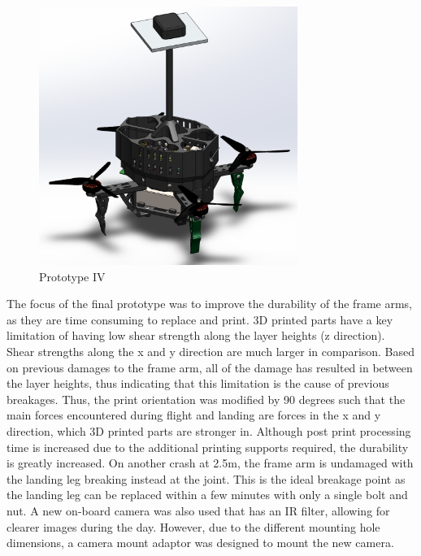 \documentclass{article}
\begin{document}
\begin{figure}[h!]
  \begin{center} 
  \caption{Prototype IV}
  \label{fig:PrototypeIV}
        \includegraphics[width=0.75\textwidth]{Reflection/PrototypeIV.png}
  \end{center}
\end{figure}

The focus of the final prototype was to improve the durability of the frame arms, as they are time consuming to replace and print. 3D printed parts have a key limitation of having low shear strength along the layer heights (z direction). Shear strengths along the x and y direction are much larger in comparison.
Based on previous damages to the frame arm, all of the damage has resulted in between the layer heights, thus indicating that this limitation is the cause of previous breakages. Thus, the print orientation was modified by 90 degrees such that the main forces encountered during flight and landing are forces in the x and y direction, which 3D printed parts are stronger in. Although post print processing time is increased due to the additional printing supports required, the durability is greatly increased.
On another crash at 2.5m, the frame arm is undamaged with the landing leg breaking instead at the joint. This is the ideal breakage point as the landing leg can be replaced within a few minutes with only a single bolt and nut.
A new on-board camera was also used that has an IR filter, allowing for clearer images during the day. However, due to the different mounting hole dimensions, a camera mount adaptor was designed to mount the new camera.
\end{document}
